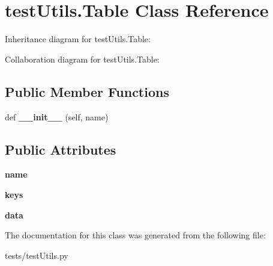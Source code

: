 \hypertarget{classtest_utils_1_1_table}{}\section{test\+Utils.\+Table Class Reference}
\label{classtest_utils_1_1_table}


Inheritance diagram for test\+Utils.\+Table\+:


Collaboration diagram for test\+Utils.\+Table\+:
\subsection*{Public Member Functions}
\begin{DoxyCompactItemize}
\item 
\mbox{\label{classtest_utils_1_1_table_a3d11f8c66ff0e02095f6677e910eeb6c}} 
def {\bfseries \+\_\+\+\_\+init\+\_\+\+\_\+} (self, name)
\end{DoxyCompactItemize}
\subsection*{Public Attributes}
\begin{DoxyCompactItemize}
\item 
\mbox{\label{classtest_utils_1_1_table_afd15828acb8eff51682a5968c4e07d35}} 
{\bfseries name}
\item 
\mbox{\label{classtest_utils_1_1_table_a3e87be4d4a2303727865e1abfeead920}} 
{\bfseries keys}
\item 
\mbox{\label{classtest_utils_1_1_table_a1d59ccbf3609dd3f7be0c8b2ccaf7317}} 
{\bfseries data}
\end{DoxyCompactItemize}


The documentation for this class was generated from the following file\+:\begin{DoxyCompactItemize}
\item 
tests/test\+Utils.\+py\end{DoxyCompactItemize}
